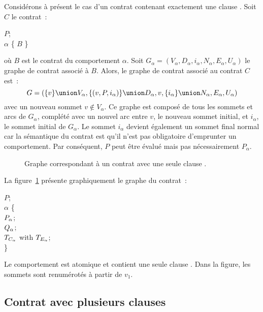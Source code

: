 Considérons à présent le cas d'un contrat contenant exactement une clause
\abehavior. Soit $C$ le contrat~:
%
\begin{pre}
\arequires \(P\); \\
\abehavior \(\alpha\) \{ \(B\) \}
\end{pre}
%
où $B$ est le contrat du comportement $\alpha$. Soit $G_\alpha = (V_\alpha,
D_\alpha, i_\alpha, N_\alpha, E_\alpha, U_\alpha)$ le graphe de contrat associé
à $B$. Alors, le graphe de contrat associé au contrat $C$ est~:
%
$$G = (
  \{v\} \union V_\alpha,
  \{(v, P, i_\alpha)\} \union D_\alpha,
  v,
  \{i_\alpha\} \union N_\alpha,
  E_\alpha,
  U_\alpha
)$$
%
avec un nouveau sommet $v \notin V_\alpha$. Ce graphe est composé de tous les
sommets et arcs de $G_\alpha$, complété avec un nouvel arc entre $v$, le nouveau
sommet initial, et $i_\alpha$, le sommet initial de $G_\alpha$. Le sommet
$i_\alpha$ devient également un sommet final normal car la sémantique du contrat
est qu'il n'est pas obligatoire d'emprunter un comportement. Par conséquent, $P$
peut être évalué mais pas nécessairement $P_\alpha$.

\begin{figure}


\caption{\label{figure:test:behavior_graph} Graphe correspondant à un contrat
avec une seule clause \abehavior.}

\end{figure}

\begin{example}

La figure~\ref{figure:test:behavior_graph} présente graphiquement le graphe du
contrat~:
%
\begin{pre}
\arequires \(P\); \\
\abehavior \(\alpha\) \{ \\
    \arequires  \(P\sb{\alpha}\); \\
    \aensures   \(Q\sb{\alpha}\); \\
    \athrowable \(T\sb{C\sb{\alpha}}\) with \(T\sb{E\sb{\alpha}}\); \\
\}
\end{pre}
%
Le comportement est atomique et contient une seule clause \athrowable. Dans la
figure, les sommets sont renumérotés à partir de $v_1$.

\end{example}

\subsection{Contrat avec plusieurs clauses \abehavior}
\label{subsection:test:behaviors_graph}

